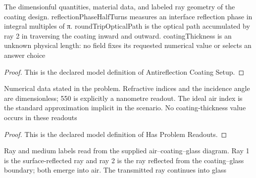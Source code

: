 \begin{definition}
  \label{def:physics:phyx-mini-0128:phyxminiproblems-problemphyxmini0128-antireflectioncoatingsetup}
  The dimensionful quantities, material data, and labeled ray geometry of the coating design. reflectionPhaseHalfTurns measures an interface reflection phase in integral multiples of π. roundTripOpticalPath is the optical path accumulated by ray 2 in traversing the coating inward and outward. coatingThickness is an unknown physical length: no field fixes its requested numerical value or selects an answer choice
\end{definition}
\begin{proof}
  This is the declared model definition of Antireflection Coating Setup.
\end{proof}
\begin{definition}
  \label{def:physics:phyx-mini-0128:phyxminiproblems-problemphyxmini0128-hasproblemreadouts}
  Numerical data stated in the problem. Refractive indices and the incidence angle are dimensionless; 550 is explicitly a nanometre readout. The ideal air index is the standard approximation implicit in the scenario. No coating-thickness value occurs in these readouts
\end{definition}
\begin{proof}
  This is the declared model definition of Has Problem Readouts.
\end{proof}
\begin{definition}
  \label{def:physics:phyx-mini-0128:phyxminiproblems-problemphyxmini0128-matchescoatingfigure}
  Ray and medium labels read from the supplied air--coating--glass diagram. Ray 1 is the surface-reflected ray and ray 2 is the ray reflected from the coating--glass boundary; both emerge into air. The transmitted ray continues into glass
\end{definition}
